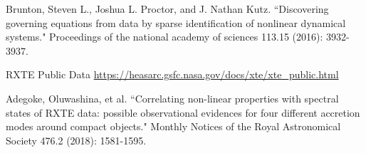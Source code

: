\documentclass[10pt,conference]{IEEEtran}
\begin{document}
\begin{thebibliography}{1}
Brunton, Steven L., Joshua L. Proctor, and J. Nathan Kutz. ``Discovering governing equations from data by sparse identification of nonlinear dynamical systems." Proceedings of the national academy of sciences 113.15 (2016): 3932-3937.

 RXTE Public Data \url{https://heasarc.gsfc.nasa.gov/docs/xte/xte_public.html}

Adegoke, Oluwashina, et al. ``Correlating non-linear properties with spectral states of RXTE data: possible observational evidences for four different accretion modes around compact objects." Monthly Notices of the Royal Astronomical Society 476.2 (2018): 1581-1595.

\end{thebibliography}

\end{document}
